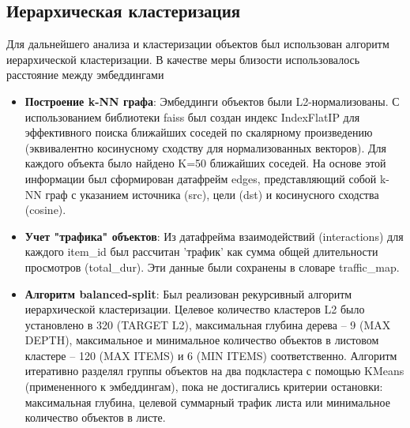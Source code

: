 \subsection*{Иерархическая кластеризация}

Для дальнейшего анализа и кластеризации объектов был использован алгоритм иерархической кластеризации. В качестве меры близости использовалось расстояние между эмбеддингами
\begin{itemize}
    \item \textbf{Построение k-NN графа}: Эмбеддинги объектов были L2-нормализованы. С использованием библиотеки faiss был создан индекс IndexFlatIP для эффективного поиска ближайших соседей по скалярному произведению (эквивалентно косинусному сходству для нормализованных векторов). Для каждого объекта было найдено K=50 ближайших соседей. На основе этой информации был сформирован датафрейм edges, представляющий собой k-NN граф с указанием источника (src), цели (dst) и косинусного сходства (cosine).

    \item \textbf{Учет "трафика" объектов}: Из датафрейма взаимодействий (interactions) для каждого item\_id был рассчитан 'трафик' как сумма общей длительности просмотров (total\_dur). Эти данные были сохранены в словаре traffic\_map.

    \item \textbf{Алгоритм balanced-split}: Был реализован рекурсивный алгоритм иерархической кластеризации. Целевое количество кластеров L2 было установлено в 320 (TARGET L2), максимальная глубина дерева – 9 (MAX DEPTH), максимальное и минимальное количество объектов в листовом кластере – 120 (MAX ITEMS) и 6 (MIN ITEMS) соответственно. Алгоритм итеративно разделял группы объектов на два подкластера с помощью KMeans (примененного к эмбеддингам), пока не достигались критерии остановки: максимальная глубина, целевой суммарный трафик листа или минимальное количество объектов в листе.


\end{itemize}
